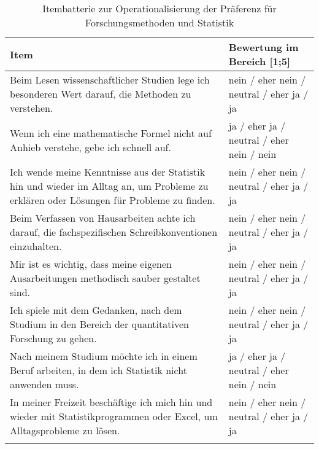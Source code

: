 \documentclass[doc]{apa7}
\begin{document}
\begin{table}[!htbp]
  \centering
    \begin{tabularx}{\textwidth}{Xl}
    \toprule
    Item & Bewertung im Bereich [1;5] \\
    \midrule
    Beim Lesen wissenschaftlicher Studien lege ich besonderen Wert darauf, die Methoden zu verstehen. & nein / eher nein / neutral / eher ja / ja \\
    \hline
    Wenn ich eine mathematische Formel nicht auf Anhieb verstehe, gebe ich schnell auf.  & ja / eher ja / neutral / eher nein / nein \\
    \hline
    Ich wende meine Kenntnisse aus der Statistik hin und wieder im Alltag an, um Probleme zu erklären oder Lösungen für Probleme zu finden. & nein / eher nein / neutral / eher ja / ja \\
    \hline
    Beim Verfassen von Hausarbeiten achte ich darauf, die fachspezifischen Schreibkonventionen einzuhalten. & nein / eher nein / neutral / eher ja / ja \\
    \hline
    Mir ist es wichtig, dass meine eigenen Ausarbeitungen methodisch sauber gestaltet sind. & nein / eher nein / neutral / eher ja / ja \\
    \hline
    Ich spiele mit dem Gedanken, nach dem Studium in den Bereich der quantitativen Forschung zu gehen. & nein / eher nein / neutral / eher ja / ja \\
    \hline
    Nach meinem Studium möchte ich in einem Beruf arbeiten, in dem ich Statistik nicht anwenden muss. & ja / eher ja / neutral / eher nein / nein \\
    \hline
    In meiner Freizeit beschäftige ich mich hin und wieder mit Statistikprogrammen oder Excel, um Alltagsprobleme zu lösen. & nein / eher nein / neutral / eher ja / ja \\
    \bottomrule
        \caption{Itembatterie zur Operationalisierung der Präferenz für Forschungsmethoden und Statistik}\label{Itembatterie}
    \end{tabularx}%
    
\end{table}%

\printbibliography
\end{document}
